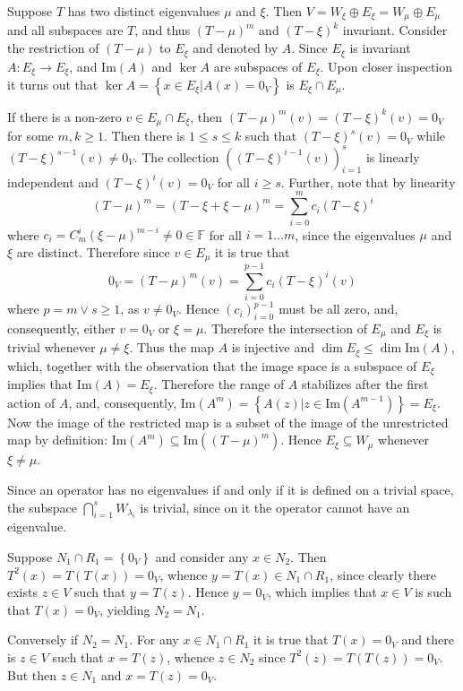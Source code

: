\documentclass[a4paper]{article}
\newcommand{\obj}[1]{\left\{{#1}\right\}}
\newcommand{\brac}[1]{{\left({#1}\right)}}
\newcommand{\im}[1]{\ensuremath{\text{Im}\brac{ #1 }}}
\begin{document}
Suppose $T$ has two distinct eigenvalues $\mu$ and $\xi$. Then $V = W_\xi \oplus E_\xi = W_\mu \oplus E_\mu$ and all subspaces are $T$, and thus $\brac{T-\mu}^m$ and $\brac{T-\xi}^k$ invariant. Consider the restriction of $\brac{T-\mu}$ to $E_\xi$ and denoted by $A$. Since $E_\xi$ is invariant $A:E_\xi\to E_\xi$, and $\im{A}$ and $\ker{A}$ are subspaces of $E_\xi$. Upon closer inspection it turns out that $\ker{A}=\obj{x\in E_\xi\vert A(x)=0_V}$ is $E_\xi \cap E_\mu$.

If there is a non-zero $v\in E_\mu\cap E_\xi$, then $\brac{T-\mu}^m(v)=\brac{T-\xi}^k(v)=0_V$ for some $m,k\geq 1$. Then there is $1\leq s\leq k$ such that $\brac{T-\xi}^s(v)=0_V$ while $\brac{T-\xi}^{s-1}(v)\neq 0_V$. The collection $\brac{\brac{T-\xi}^{i-1}(v)}_{i=1}^s$ is linearly independent and $\brac{T-\xi}^i(v)=0_V$ for all $i\geq s$. Further, note that by linearity \[\brac{T-\mu}^m=\brac{T-\xi+\xi-\mu}^m = \sum_{i=0}^m c_i \brac{T-\xi}^i\] where $c_i=C_m^i \brac{\xi-\mu}^{m-i}\neq 0\in\mathbb{F}$ for all $i=1\ldots m$, since the eigenvalues $\mu$ and $\xi$ are distinct. Therefore since $v\in E_\mu$ it is true that \[0_V = \brac{T-\mu}^m(v) = \sum_{i=0}^{p-1} c_i \brac{T-\xi}^i(v)\] where $p=m\vee s\geq 1$, as $v\neq 0_V$. Hence $\brac{c_i}_{i=0}^{p-1}$ must be all zero, and, consequently, either $v=0_V$ or $\xi=\mu$. Therefore the intersection of $E_\mu$ and $E_\xi$ is trivial whenever $\mu\neq \xi$. Thus the map $A$ is injective and $\dim{E_\xi}\leq \dim{\im{A}}$, which, together with the observation that the image space is a subspace of $E_\xi$ implies that $\im{A}=E_\xi$. Therefore the range of $A$ stabilizes after the first action of $A$, and, consequently, $\im{A^m} = \obj{A(z)\vert z\in \im{A^{m-1}}} = E_\xi$. Now the image of the restricted map is a subset of the image of the unrestricted map by definition: $\im{A^m}\subseteq \im{\brac{T-\mu}^m}$. Hence $E_\xi\subseteq W_\mu$ whenever $\xi\neq \mu$.


Since an operator has no eigenvalues if and only if it is defined on a trivial space, the subspace $\bigcap_{i=1}^s W_{\lambda_i}$ is trivial, since on it the operator cannot have an eigenvalue.


Suppose $N_1\cap R_1 = \obj{0_V}$ and consider any $x\in N_2$. Then $T^2(x)=T\brac{T(x)}=0_V$, whence $y=T(x)\in N_1\cap R_1$, since clearly there exists $z\in V$ such that $y=T(z)$. Hence $y=0_V$, which implies that $x\in V$ is such that $T(x)=0_V$, yielding $N_2=N_1$.

Conversely if $N_2=N_1$. For any $x\in N_1\cap R_1$ it is true that $T(x) = 0_V$ and there is $z\in V$ such that $x=T(z)$, whence $z\in N_2$ since $T^2(z) = T\brac{T(z)} = 0_V$. But then $z\in N_1$ and $x=T(z)=0_V$.
\end{document}
